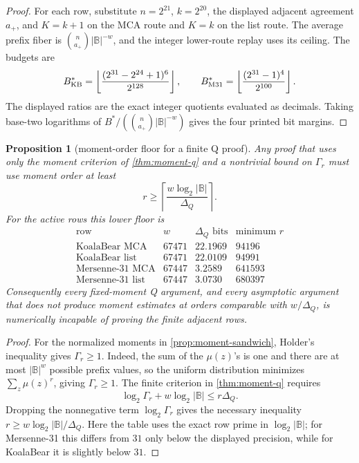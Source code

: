 \documentclass[a4paper,11pt]{amsart}
\newtheorem{proposition}[proposition]{Proposition}
\theoremstyle{remark}
\newcommand{\B}{\mathbb B}
\begin{document}
\begin{proof}
For each row, substitute \(n=2^{21}\), \(k=2^{20}\), the displayed adjacent agreement \(a_+\), and \(K=k+1\) on the MCA route and \(K=k\) on the list route.  The average prefix fiber is \(\binom n{a_+}|\B|^{-w}\), and the integer lower-route replay uses its ceiling.  The budgets are
\[
        B^*_{\rm KB}=\left\lfloor\frac{(2^{31}-2^{24}+1)^6}{2^{128}}\right\rfloor,
        \qquad
        B^*_{\rm M31}=\left\lfloor\frac{(2^{31}-1)^4}{2^{100}}\right\rfloor .
\]
The displayed ratios are the exact integer quotients evaluated as decimals.  Taking base-two logarithms of \(B^*/(\binom n{a_+}|\B|^{-w})\) gives the four printed bit margins.
\end{proof}

\begin{proposition}[moment-order floor for a finite Q proof]\label{prop:q-moment-order-floor}
Any proof that uses only the moment criterion of \cref{thm:moment-q} and a nontrivial bound on \(\Gamma_r\) must use moment order at least
\[
        r\ge\left\lceil\frac{w\log_2|\B|}{\Delta_Q}\right\rceil .
\]
For the active rows this lower floor is
\[
\begin{array}{c|r|r|r}
\text{row} & w & \Delta_Q\text{ bits} & \text{minimum }r\\
\hline
\text{KoalaBear MCA} & 67471 & 22.1969 & 94196\\
\text{KoalaBear list} & 67471 & 22.0109 & 94991\\
\text{Mersenne-31 MCA} & 67447 & 3.2589 & 641593\\
\text{Mersenne-31 list} & 67447 & 3.0730 & 680397
\end{array}
\]
Consequently every fixed-moment Q argument, and every asymptotic argument that does not produce moment estimates at orders comparable with \(w/\Delta_Q\), is numerically incapable of proving the finite adjacent rows.
\end{proposition}

\begin{proof}
For the normalized moments in \cref{prop:moment-sandwich}, Holder's inequality gives \(\Gamma_r\ge1\).  Indeed, the sum of the \(\mu(z)\)'s is one and there are at most \(|\B|^w\) possible prefix values, so the uniform distribution minimizes \(\sum_z\mu(z)^r\), giving \(\Gamma_r\ge1\).  The finite criterion in \cref{thm:moment-q} requires
\[
        \log_2\Gamma_r+w\log_2|\B|\le r\Delta_Q .
\]
Dropping the nonnegative term \(\log_2\Gamma_r\) gives the necessary inequality \(r\ge w\log_2|\B|/\Delta_Q\).  Here the table uses the exact row prime in \(\log_2|\B|\); for Mersenne-31 this differs from \(31\) only below the displayed precision, while for KoalaBear it is slightly below \(31\).
\end{proof}
\end{document}
